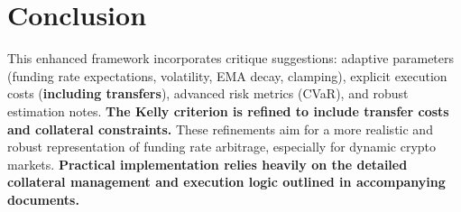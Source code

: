 \documentclass{article}
\begin{document}
\section{Conclusion}

This enhanced framework incorporates critique suggestions: adaptive parameters (funding rate expectations, volatility, EMA decay, clamping), explicit execution costs (\textbf{including transfers}), advanced risk metrics (CVaR), and robust estimation notes. \textbf{The Kelly criterion is refined to include transfer costs and collateral constraints.} These refinements aim for a more realistic and robust representation of funding rate arbitrage, especially for dynamic crypto markets. \textbf{Practical implementation relies heavily on the detailed collateral management and execution logic outlined in accompanying documents.}
\end{document}
